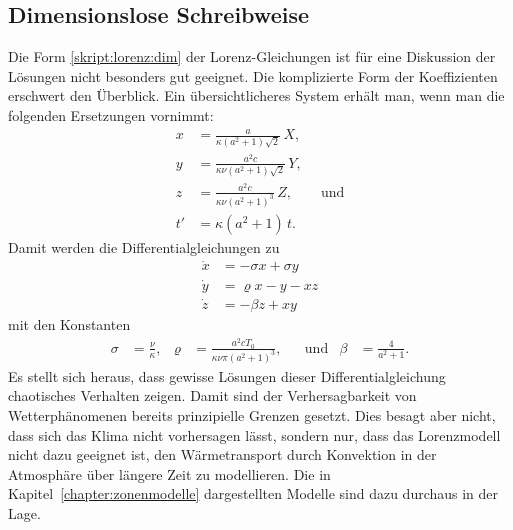 \subsection{Dimensionslose Schreibweise}
Die Form \eqref{skript:lorenz:dim} der Lorenz-Gleichungen ist für eine
Diskussion der Lösungen nicht besonders gut geeignet.
Die komplizierte Form der Koeffizienten erschwert den Überblick.
Ein übersichtlicheres System erhält man, wenn man die folgenden
Ersetzungen vornimmt:
\begin{align*}
x
&=
\frac{a}{\kappa(a^2+1)\sqrt{2}}
\,
X,
\\
y
&=
\frac{a^2 c}{\kappa \nu (a^2+1)\sqrt{2}}
\,
Y,
\\
z
&=
\frac{a^2c}{\kappa\nu(a^2+1)^3}
\,
Z,\qquad\text{und}
\\
t'
&=
\kappa (a^2+1)\, t.
\end{align*}
Damit werden die Differentialgleichungen zu
\begin{align*}
\dot x &= -\sigma x + \sigma y\\
\dot y &= \varrho x - y - x z\\
\dot z &= -\beta z + x y
\end{align*}
mit den Konstanten
\begin{align*}
\sigma
&=
\frac{\nu}{\kappa},
&
\varrho
&=
\frac{a^2cT_0}{\kappa\nu\pi(a^2+1)^3},
&&\text{und}&
\beta
&=
\frac{4}{a^2 +1}.
\end{align*}
Es stellt sich heraus, dass gewisse Lösungen dieser Differentialgleichung
chaotisches Verhalten zeigen.
Damit sind der Verhersagbarkeit von Wetterphänomenen bereits prinzipielle
Grenzen gesetzt.
Dies besagt aber nicht, dass sich das Klima nicht vorhersagen lässt,
sondern nur, dass das Lorenzmodell nicht dazu geeignet ist, den
Wärmetransport durch Konvektion in der Atmosphäre über längere Zeit
zu modellieren.
Die in Kapitel~\ref{chapter:zonenmodelle} dargestellten Modelle sind
dazu durchaus in der Lage.






